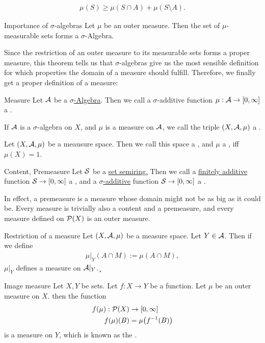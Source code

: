 \begin{align*}
	\mu(S) \geq \mu(S \cap A) + \mu(S \setminus A).
\end{align*}
\begin{importanttheorem}{Importance of $\sigma$-algebras}{}
	Let $\mu$ be an outer measure. Then the set of $\mu$-measurable sets forms a $\sigma$-Algebra.
\end{importanttheorem}
Since the restriction of an outer measure to its measurable sets forms a proper measure, this theorem tells us that $\sigma$-algebras give us the most sensible definition for which properties the domain of a measure should fulfill. Therefore, we finally get a proper definition of a measure:
\begin{importantdefinition}{Measure}{}
	Let $\mathcal{A}$ be a \ul{$\sigma$-Algebra}. Then we call a $\sigma$-additive function $\mu : \mathcal{A} \to [0,\infty]$ a .
\end{importantdefinition}
\begin{definition}
	If $\mathcal{A}$ is a $\sigma$-algebra on $X$, and $\mu$ is a measure on $\mathcal{A}$, we call the triple $(X,\mathcal{A},\mu)$ a .
\end{definition}
\begin{definition}
	Let $(X, \mathcal{A}, \mu)$ be a meausure space. Then we call this space a , and $\mu$ a , iff $\mu(X) = 1$.
\end{definition}
\begin{importantdefinition}{Content, Premeasure}{}
	Let $\mathcal{S}$ be a \ul{set semiring.} Then we call a \ul{finitely additive} function $\mathcal{S} \to [0,\infty]$ a , and a \ul{$\sigma$-additive} function $\mathcal{S} \to [0,\infty]$ a .
\end{importantdefinition}
In effect, a premeasure is a measure whose domain might not be as big as it could be. Every measure is trivially also a content and a premeasure, and every measure defined on $\mathcal{P}(X)$ is an outer measure.
\begin{importanttheorem}{Restriction of a measure}{}
	Let $(X, \mathcal{A}, \mu)$ be a measure space. Let $Y \in \mathcal{A}$. Then if we define
	\begin{align*}
		\mu|_Y(A \cap M) := \mu(A \cap M),
	\end{align*}
	$\mu|_Y$ defines a measure on $\mathcal{A}|_Y$.¸
\end{importanttheorem}
\begin{importanttheorem}{Image measure}{}
	Let $X,Y$ be sets. Let $f : X \to Y$ be a function. Let $\mu$ be an outer measure on $X$. then the function
	\begin{align*}
		f(\mu) : \mathcal{P}(X) &\to [0, \infty]\\
		f(\mu)(B) &= \mu\qty(f^{-1}(B))
	\end{align*}
	is a measure on $Y$, which is known as the .
\end{importanttheorem}
